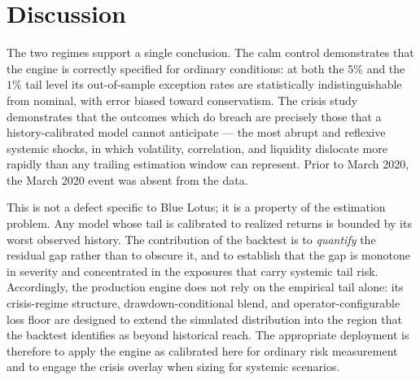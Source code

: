 \documentclass[11pt]{article}
\theoremstyle{definition}
\begin{document}
\section{Discussion}
\label{sec:discussion}

The two regimes support a single conclusion. The calm control demonstrates that
the engine is correctly specified for ordinary conditions: at both the $5\%$ and
the $1\%$ tail level its out-of-sample exception rates are statistically
indistinguishable from nominal, with error biased toward conservatism. The crisis
study demonstrates that the outcomes which do breach are precisely those that a
history-calibrated model cannot anticipate --- the most abrupt and reflexive
systemic shocks, in which volatility, correlation, and liquidity dislocate more
rapidly than any trailing estimation window can represent. Prior to March 2020,
the March 2020 event was absent from the data.

This is not a defect specific to Blue Lotus; it is a property of the estimation
problem. Any model whose tail is calibrated to realized returns is bounded by its
worst observed history. The contribution of the backtest is to \emph{quantify} the
residual gap rather than to obscure it, and to establish that the gap is monotone
in severity and concentrated in the exposures that carry systemic tail risk.
Accordingly, the production engine does not rely on the empirical tail alone: its
crisis-regime structure, drawdown-conditional blend, and operator-configurable loss
floor are designed to extend the simulated distribution into the region that the
backtest identifies as beyond historical reach. The appropriate deployment is
therefore to apply the engine as calibrated here for ordinary risk measurement and
to engage the crisis overlay when sizing for systemic scenarios.

\end{document}

